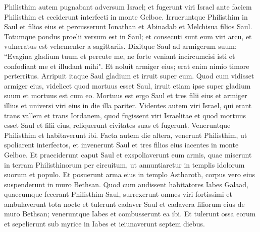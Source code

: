 \begin{biblechapter}  
\verse Philisthim autem pugnabant adversum Israel; et fugerunt viri Israel ante faciem Philisthim et ceciderunt interfecti in monte Gelboe. 
\verse Irrueruntque Philisthim in Saul et filios eius et percusserunt Ionathan et Abinadab et Melchisua filios Saul. 
\verse Totumque pondus proelii versum est in Saul; et consecuti sunt eum viri arcu, et vulneratus est vehementer a sagittariis. 
\verse Dixitque Saul ad armigerum suum: “Evagina gladium tuum et percute me, ne forte veniant incircumcisi isti et confodiant me et illudant mihi". Et noluit armiger eius; erat enim nimio timore perterritus. Arripuit itaque Saul gladium et irruit super eum. 
\verse Quod cum vidisset armiger eius, videlicet quod mortuus esset Saul, irruit etiam ipse super gladium suum et mortuus est cum eo. 
\verse Mortuus est ergo Saul et tres filii eius et armiger illius et universi viri eius in die illa pariter. 
\verse Videntes autem viri Israel, qui erant trans vallem et trans Iordanem, quod fugissent viri Israelitae et quod mortuus esset Saul et filii eius, reliquerunt civitates suas et fugerunt. Veneruntque Philisthim et habitaverunt ibi. 
\verse Facta autem die altera, venerunt Philisthim, ut spoliarent interfectos, et invenerunt Saul et tres filios eius iacentes in monte Gelboe. 
\verse Et praeciderunt caput Saul et exspoliaverunt eum armis, quae miserunt in terram Philisthinorum per circuitum, ut annuntiaretur in templis idolorum suorum et populo. 
\verse Et posuerunt arma eius in templo Astharoth, corpus vero eius suspenderunt in muro Bethsan. 
\verse Quod cum audissent habitatores Iabes Galaad, quaecumque fecerant Philisthim Saul, 
\verse surrexerunt omnes viri fortissimi et ambulaverunt tota nocte et tulerunt cadaver Saul et cadavera filiorum eius de muro Bethsan; veneruntque Iabes et combusserunt ea ibi. 
\verse Et tulerunt ossa eorum et sepelierunt sub myrice in Iabes et ieiunaverunt septem diebus.
\end{biblechapter}
